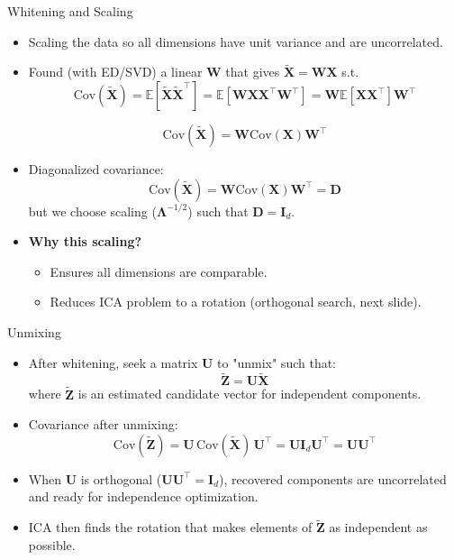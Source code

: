 \documentclass{beamer}
\begin{document}
\begin{frame}{Whitening and Scaling}
  \begin{itemize}
    \item Scaling the data so all dimensions have unit variance and are uncorrelated.
    \item Found (with ED/SVD) a linear $\mathbf{W}$ that gives $\widetilde{\mathbf{X}} = \mathbf{W}\mathbf{X}$ s.t.
      \[
         \mathrm{Cov}(\widetilde{\mathbf{X}}) = \mathbb{E}[\widetilde{\mathbf{X}} \widetilde{\mathbf{X}}^\top] = \mathbb{E}[\mathbf{W}\mathbf{X}\mathbf{X}^\top\mathbf{W}^\top]
         = \mathbf{W}\mathbb{E}[\mathbf{X}\mathbf{X}^\top]\mathbf{W}^\top
      \]

      \[
         \mathrm{Cov}(\widetilde{\mathbf{X}})
         = \mathbf{W}\mathrm{Cov}(\mathbf{X})\mathbf{W}^\top
      \]
    \item Diagonalized covariance:
      \[
        \mathrm{Cov}(\widetilde{\mathbf{X}}) = 
        \mathbf{W} \mathrm{Cov}(\mathbf{X}) \mathbf{W}^\top = \mathbf{D}
      \]
      but we choose scaling ($\mathbf{\Lambda}^{-1/2}$) such that $\mathbf{D} = \mathbf{I}_d$.
    \item \textbf{Why this scaling?}
      \begin{itemize}
        \item Ensures all dimensions are comparable.
        \item Reduces ICA problem to a rotation (orthogonal search, next slide).
      \end{itemize}
  \end{itemize}
\end{frame}

\begin{frame}{Unmixing}
  \begin{itemize}
    \item After whitening, seek a matrix $\mathbf{U}$ to "unmix" such that:
      \[
        \widetilde{\mathbf{Z}} = \mathbf{U} \widetilde{\mathbf{X}}
      \]
      where $\widetilde{\mathbf{Z}}$ is an estimated candidate vector for independent components.
    \item Covariance after unmixing:
      \[
        \mathrm{Cov}(\widetilde{\mathbf{Z}}) = \mathbf{U}\, \mathrm{Cov}(\widetilde{\mathbf{X}}) \, \mathbf{U}^\top = \mathbf{U} \mathbf{I}_d \mathbf{U}^\top = \mathbf{U}\mathbf{U}^\top
      \]
    \item When $\mathbf{U}$ is orthogonal ($\mathbf{U}\mathbf{U}^\top = \mathbf{I}_d$), recovered components are uncorrelated and ready for independence optimization.
    \item ICA then finds the rotation that makes elements of $\widetilde{\mathbf{Z}}$ as independent as possible.
  \end{itemize}
\end{frame}
\end{document}
